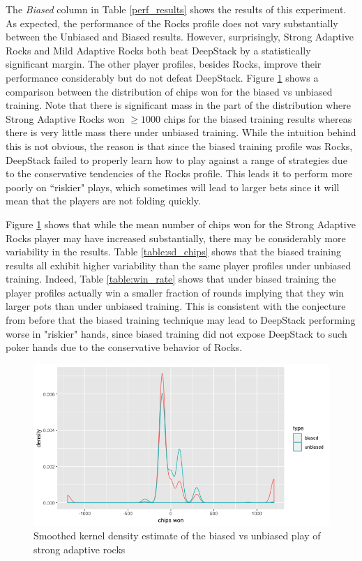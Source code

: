 \documentclass{article}
\begin{document}
\indent The \textit{Biased} column in Table \ref{perf_results} shows the results of this experiment. As expected, the performance of the Rocks profile does not vary substantially between the Unbiased and Biased results. However, surprisingly, Strong Adaptive Rocks and Mild Adaptive Rocks both beat DeepStack by a statistically significant margin. The other player profiles, besides Rocks, improve their performance considerably but do not defeat DeepStack. Figure \ref{fig:strong_adaptive} shows a comparison between the distribution of chips won for the biased vs unbiased training. Note that there is significant mass in the part of the distribution where Strong Adaptive Rocks won $\geq1000$ chips for the biased training results whereas there is very little mass there under unbiased training. While the intuition behind this is not obvious, the reason is that since the biased training profile was Rocks, DeepStack failed to properly learn how to play against a range of strategies due to the conservative tendencies of the Rocks profile. This leads it to perform more poorly on ``riskier" plays, which sometimes will lead to larger bets since it will mean that the players are not folding quickly.

\indent Figure \ref{fig:strong_adaptive} shows that while the mean number of chips won for the Strong Adaptive Rocks player may have increased substantially, there may be considerably more variability in the results. Table \ref{table:sd_chips} shows that the biased training results all exhibit higher variability than the same player profiles under unbiased training. Indeed, Table \ref{table:win_rate} shows that under biased training the player profiles actually win a smaller fraction of rounds implying that they win larger pots than under unbiased training. This is consistent with the conjecture from before that the biased training technique may lead to DeepStack performing worse in "riskier" hands, since biased training did not expose DeepStack to such poker hands due to the conservative behavior of Rocks.

\begin{figure}[H]
    \centering
    \includegraphics[scale=0.3]{figures/strong_adaptive_plot}
    \caption{Smoothed kernel density estimate of the biased vs unbiased play of strong adaptive rocks}
    \label{fig:strong_adaptive}
\end{figure}
\end{document}
